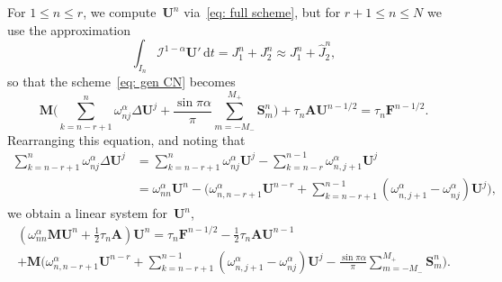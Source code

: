 \documentclass[a4paper,12pt]{article}
\newcommand{\bs}[1]{\boldsymbol{#1}}
\newcommand{\ud}{\mathrm{d}}
\begin{document}
For $1\le n\le r$, we compute~$\bs{U}^n$ via~\eqref{eq: full scheme}, but for
$r+1\le n\le N$ we use the approximation
\[
\int_{I_n}\mathcal{I}^{1-\alpha}\bs{U}'\,\ud t=J_1^n+J_2^n
    \approx J_1^n+\hat J_2^n,
\]
so that the scheme~\eqref{eq: gen CN} becomes
\[
\bs{M}\biggl(\sum_{k=n-r+1}^n \omega^\alpha_{nj}\Delta\bs{U}^j
    +\frac{\sin\pi\alpha}{\pi}\sum_{m=-M_-}^{M_+} \bs{S}^n_m\biggr)
    +\tau_n\bs{A}\bs{U}^{n-1/2}=\tau_n\bs{F}^{n-1/2}.
\]
Rearranging this equation, and noting that
\begin{align*}
\sum_{k=n-r+1}^n\omega^\alpha_{nj}\Delta\bs{U}^j
    &=\sum_{k=n-r+1}^n\omega^\alpha_{nj}\bs{U}^j
    -\sum_{k=n-r}^{n-1}\omega^\alpha_{n,j+1}\bs{U}^j\\
    &=\omega^\alpha_{nn}\bs{U}^n-\biggl(\omega^\alpha_{n,n-r+1}\bs{U}^{n-r}
    +\sum_{k=n-r+1}^{n-1}(\omega^\alpha_{n,j+1}-\omega^\alpha_{nj})\bs{U}^j
    \biggr),
\end{align*}
we obtain a linear system for~$\bs{U}^n$,
\begin{multline*}
(\omega^\alpha_{nn}\bs{M}\bs{U}^n+\tfrac12\tau_n\bs{A})\bs{U}^n
    =\tau_n\bs{F}^{n-1/2}-\tfrac12\tau_n\bs{A}\bs{U}^{n-1}\\
    +\bs{M}\biggl(\omega^\alpha_{n,n-r+1}\bs{U}^{n-r}
    +\sum_{k=n-r+1}^{n-1}(\omega^\alpha_{n,j+1}-\omega^\alpha_{nj})\bs{U}^j
    -\frac{\sin\pi\alpha}{\pi}\sum_{m=-M_-}^{M_+}\bs{S}^n_m\biggr).
\end{multline*}
\end{document}
